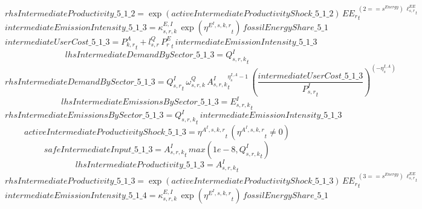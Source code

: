 \begin{dmath*}
rhsIntermediateProductivity\_5\_1\_2 = \exp\left({activeIntermediateProductivityShock\_5\_1\_2}\right)\, {{EE_r}}_{t}^{\left(2=={{s^{Energy}}}\right)\, {{\ell^{EE}_{s,r}}}_{t}}
\end{dmath*}
\begin{dmath*}
intermediateEmissionIntensity\_5\_1\_3 = {{\kappa^{E,I}_{s,r,k}}}\, \exp\left({{\eta^{E^{I},s,k,r}}}_{t}\right)\, {fossilEnergyShare\_5\_1}
\end{dmath*}
\begin{dmath*}
intermediateUserCost\_5\_1\_3 = {{P^{A}_{k,r}}}_{t}+{{l^{Q}_{s,r}}}\, {{P^E_r}}_{t}\, {intermediateEmissionIntensity\_5\_1\_3}
\end{dmath*}
\begin{dmath*}
lhsIntermediateDemandBySector\_5\_1\_3 = {{Q^{I}_{s,r,k}}}_{t}
\end{dmath*}
\begin{dmath*}
rhsIntermediateDemandBySector\_5\_1\_3 = {{Q^{I}_{s,r}}}_{t}\, {{\omega^{Q}_{s,r,k}}}\, {{A^{I}_{s,r,k}}}_{t}^{{{\eta^{I,A}_{s}}}-1}\, \left(\frac{{intermediateUserCost\_5\_1\_3}}{{{P^{I}_{s,r}}}_{t}}\right)^{\left(-{{\eta^{I,A}_{s}}}\right)}
\end{dmath*}
\begin{dmath*}
lhsIntermediateEmissionsBySector\_5\_1\_3 = {{E^I_{s,r,k}}}_{t}
\end{dmath*}
\begin{dmath*}
rhsIntermediateEmissionsBySector\_5\_1\_3 = {{Q^{I}_{s,r,k}}}_{t}\, {intermediateEmissionIntensity\_5\_1\_3}
\end{dmath*}
\begin{dmath*}
activeIntermediateProductivityShock\_5\_1\_3 = {{\eta^{A^{I},s,k,r}}}_{t}\, \left({{\eta^{A^{I},s,k,r}}}_{t}\neq 0\right)
\end{dmath*}
\begin{dmath*}
safeIntermediateInput\_5\_1\_3 = {{A^{I}_{s,r,k}}}_{t}\, max(1e-8,{{Q^{I}_{s,r,k}}}_{t})
\end{dmath*}
\begin{dmath*}
lhsIntermediateProductivity\_5\_1\_3 = {{A^{I}_{s,r,k}}}_{t}
\end{dmath*}
\begin{dmath*}
rhsIntermediateProductivity\_5\_1\_3 = \exp\left({activeIntermediateProductivityShock\_5\_1\_3}\right)\, {{EE_r}}_{t}^{\left(3=={{s^{Energy}}}\right)\, {{\ell^{EE}_{s,r}}}_{t}}
\end{dmath*}
\begin{dmath*}
intermediateEmissionIntensity\_5\_1\_4 = {{\kappa^{E,I}_{s,r,k}}}\, \exp\left({{\eta^{E^{I},s,k,r}}}_{t}\right)\, {fossilEnergyShare\_5\_1}
\end{dmath*}
